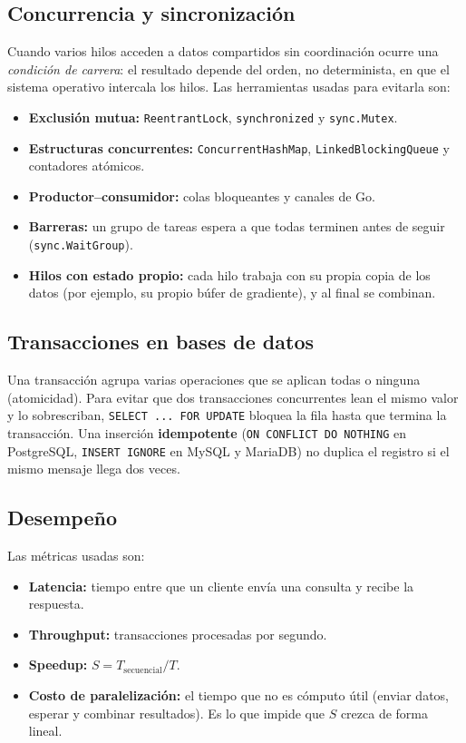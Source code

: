 \documentclass[10pt,a4paper]{article}
\begin{document}
\subsection{Concurrencia y sincronización}

Cuando varios hilos acceden a datos compartidos sin coordinación ocurre una \textit{condición de
carrera}: el resultado depende del orden, no determinista, en que el sistema operativo intercala los
hilos. Las herramientas usadas para evitarla son:
\begin{itemize}
    \item \textbf{Exclusión mutua:} \texttt{ReentrantLock}, \texttt{synchronized} y \texttt{sync.Mutex}.
    \item \textbf{Estructuras concurrentes:} \texttt{ConcurrentHashMap}, \texttt{LinkedBlockingQueue}
    y contadores atómicos.
    \item \textbf{Productor--consumidor:} colas bloqueantes y canales de Go.
    \item \textbf{Barreras:} un grupo de tareas espera a que todas terminen antes de seguir
    (\texttt{sync.WaitGroup}).
    \item \textbf{Hilos con estado propio:} cada hilo trabaja con su propia copia de los datos (por
    ejemplo, su propio búfer de gradiente), y al final se combinan.
\end{itemize}

\subsection{Transacciones en bases de datos}

Una transacción agrupa varias operaciones que se aplican todas o ninguna (atomicidad). Para evitar que
dos transacciones concurrentes lean el mismo valor y lo sobrescriban, \texttt{SELECT ... FOR UPDATE}
bloquea la fila hasta que termina la transacción. Una inserción \textbf{idempotente}
(\texttt{ON CONFLICT DO NOTHING} en PostgreSQL, \texttt{INSERT IGNORE} en MySQL y MariaDB) no duplica el
registro si el mismo mensaje llega dos veces.

\subsection{Desempeño}

Las métricas usadas son:
\begin{itemize}
    \item \textbf{Latencia:} tiempo entre que un cliente envía una consulta y recibe la respuesta.
    \item \textbf{Throughput:} transacciones procesadas por segundo.
    \item \textbf{Speedup:} $S = T_{\text{secuencial}} / T$.
    \item \textbf{Costo de paralelización:} el tiempo que no es cómputo útil (enviar datos, esperar y
    combinar resultados). Es lo que impide que $S$ crezca de forma lineal.
\end{itemize}
\end{document}
